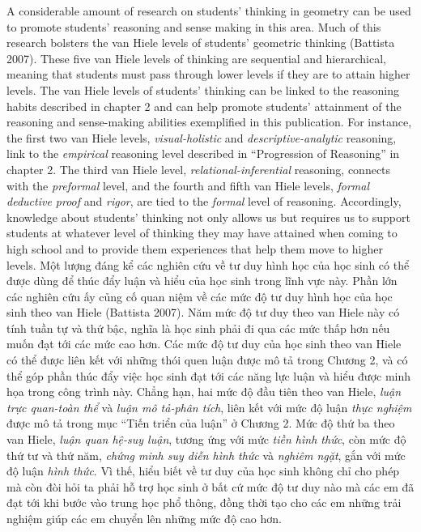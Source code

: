 \documentclass[
  10pt,
  a4paper,
  landscape,
  twoside,
  openany
]{scrbook}
\newcommand{\EN}[1]{#1}
\newcommand{\VI}[1]{#1}
\begin{document}
\TriPara
{
\EN{A considerable amount of research on students' thinking in geometry can be used to promote students' reasoning and sense making in this area. Much of this research bolsters the van Hiele levels of students' geometric thinking (Battista 2007). These five van Hiele levels of thinking are sequential and hierarchical, meaning that students must pass through lower levels if they are to attain higher levels. The van Hiele levels of students' thinking can be linked to the reasoning habits described in chapter 2 and can help promote students' attainment of the reasoning and sense-making abilities exemplified in this publication. For instance, the first two van Hiele levels, \emph{visual-holistic} and \emph{descriptive-analytic} reasoning, link to the \emph{empirical} reasoning level described in ``Progression of Reasoning'' in chapter 2. The third van Hiele level, \emph{relational-inferential} reasoning, connects with the \emph{preformal} level, and the fourth and fifth van Hiele levels, \emph{formal deductive proof} and \emph{rigor}, are tied to the \emph{formal} level of reasoning. Accordingly, knowledge about students' thinking not only allows us but requires us to support students at whatever level of thinking they may have attained when coming to high school and to provide them experiences that help them move to higher levels.}
}
{
\VI{Một lượng đáng kể các nghiên cứu về tư duy hình học của học sinh có thể được dùng để thúc đẩy luận và hiểu của học sinh trong lĩnh vực này. Phần lớn các nghiên cứu ấy củng cố quan niệm về các mức độ tư duy hình học của học sinh theo van Hiele (Battista 2007). Năm mức độ tư duy theo van Hiele này có tính tuần tự và thứ bậc, nghĩa là học sinh phải đi qua các mức thấp hơn nếu muốn đạt tới các mức cao hơn. Các mức độ tư duy của học sinh theo van Hiele có thể được liên kết với những thói quen luận được mô tả trong Chương 2, và có thể góp phần thúc đẩy việc học sinh đạt tới các năng lực luận và hiểu được minh họa trong công trình này. Chẳng hạn, hai mức độ đầu tiên theo van Hiele, \emph{luận trực quan-toàn thể} và \emph{luận mô tả-phân tích}, liên kết với mức độ luận \emph{thực nghiệm} được mô tả trong mục ``Tiến triển của luận'' ở Chương 2. Mức độ thứ ba theo van Hiele, \emph{luận quan hệ-suy luận}, tương ứng với mức \emph{tiền hình thức}, còn mức độ thứ tư và thứ năm, \emph{chứng minh suy diễn hình thức} và \emph{nghiêm ngặt}, gắn với mức độ luận \emph{hình thức}. Vì thế, hiểu biết về tư duy của học sinh không chỉ cho phép mà còn đòi hỏi ta phải hỗ trợ học sinh ở bất cứ mức độ tư duy nào mà các em đã đạt tới khi bước vào trung học phổ thông, đồng thời tạo cho các em những trải nghiệm giúp các em chuyển lên những mức độ cao hơn.}
}
\end{document}

